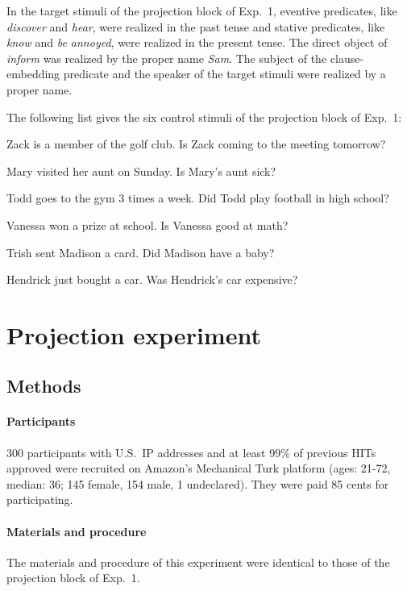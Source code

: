 \documentclass[11pt,fleqn]{article}
\newcommand{\6}{\mbox{$[\hspace*{-.6mm}[$}}
\newcommand{\9}{\mbox{$]\hspace*{-.6mm}]$}}
\begin{document}
In the target stimuli of the projection block of Exp.~1, eventive predicates, like {\em discover} and {\em hear}, were realized in the past tense and stative predicates, like {\em know} and {\em be annoyed}, were realized in the present tense. The direct object of {\em inform} was realized by the proper name {\em Sam}. The subject of the clause-embedding predicate and the speaker of the target stimuli were realized by a proper name. 

\bigskip
\noindent
The following list gives the six control stimuli of the projection block of Exp.~1: 

\begin{enumerate}[leftmargin=3ex,itemsep=-2pt]
  Zack is a member of the golf club. Is Zack coming to the meeting tomorrow?

 Mary visited her aunt on Sunday. Is Mary's aunt sick?

 Todd goes to the gym 3 times a week. Did Todd play football in high school?

 Vanessa won a prize at school. Is Vanessa good at math?

 Trish sent Madison a card. Did Madison have a baby?

 Hendrick just bought a car. Was Hendrick's car expensive?
\end{enumerate}

\section{Projection experiment}\label{a-proj}

\subsection{Methods}

\paragraph{Participants} 300 participants with U.S.\ IP addresses and at least 99\% of previous HITs approved were recruited on Amazon's Mechanical Turk platform (ages: 21-72, median: 36; 145 female, 154 male, 1 undeclared). They were paid 85 cents for participating. 

\paragraph{Materials and procedure} The materials and procedure of this experiment were identical to those of the projection block of Exp.~1. 
\end{document}
